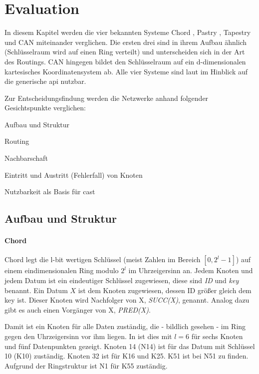 


\section{Evaluation}
In diesem Kapitel werden die vier bekannten Systeme Chord \cite{Stoica2003}, Pastry \cite{Rowstron2001}, Tapestry \cite{Zhao2001Tapestry,Zhao2004Tapestry} und CAN \cite{Ratnasamy2001Scalable} miteinander verglichen. Die ersten drei sind in ihrem Aufbau ähnlich (Schlüsselraum wird auf einen Ring verteilt) und unterscheiden sich in der Art des Routings. CAN hingegen bildet den Schlüsselraum auf ein d-dimensionalen kartesisches Koordinatensystem ab. Alle vier Systeme sind laut \cite{Dabek2003Towards} im Hinblick auf die generische \ac{api} nutzbar.

Zur Entscheidungsfindung werden die Netzwerke anhand folgender Gesichtspunkte verglichen:
\begin{itemize*}
\item Aufbau und Struktur
\item Routing
\item Nachbarschaft
\item Eintritt und Austritt (Fehlerfall) von Knoten
\item Nutzbarkeit als Basis für \ac{cast}
\end{itemize*}

\subsection{Aufbau und Struktur}
\paragraph{Chord}
Chord \cite{Stoica2003} legt die l-bit wertigen Schlüssel (meist Zahlen im Bereich $[0,2^l-1]$) auf einem eindimensionalen Ring modulo $2^l$ im Uhrzeigersinn an. Jedem Knoten und jedem Datum ist ein eindeutiger Schlüssel zugewiesen, diese sind \emph{ID} und \emph{key} benannt. Ein Datum $X$ ist dem Knoten zugewiesen, dessen ID größer gleich dem key ist. Dieser Knoten wird Nachfolger von X, \emph{SUCC(X)}, genannt. Analog dazu gibt es auch einen Vorgänger von X, \emph{PRED(X)}.

Damit ist ein Knoten für alle Daten zuständig, die - bildlich gesehen - im Ring gegen den Uhrzeigersinn vor ihm liegen. In  ist dies mit $l=6$ für sechs Knoten und fünf Datenpunkten gezeigt. Knoten 14 (N14) ist für das Datum mit Schlüssel 10 (K10) zuständig. Knoten 32 ist für K16 und K25. K51 ist bei N51 zu finden. Aufgrund der Ringstruktur ist N1 für K55 zuständig.

